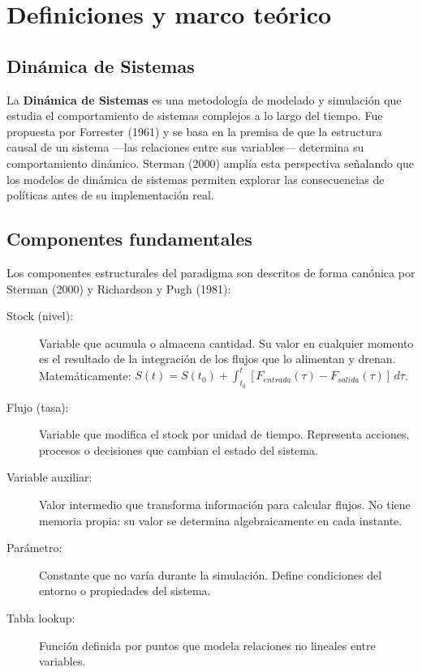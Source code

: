 \documentclass[10pt,a4paper]{article}
\begin{document}
\newpage

\section{Definiciones y marco teórico}

\subsection{Dinámica de Sistemas}

La \textbf{Dinámica de Sistemas} es una metodología de modelado y simulación que estudia el comportamiento de sistemas complejos a lo largo del tiempo. Fue propuesta por Forrester (1961) y se basa en la premisa de que la estructura causal de un sistema ---las relaciones entre sus variables--- determina su comportamiento dinámico. Sterman (2000) amplía esta perspectiva señalando que los modelos de dinámica de sistemas permiten explorar las consecuencias de políticas antes de su implementación real.

\subsection{Componentes fundamentales}

Los componentes estructurales del paradigma son descritos de forma canónica por Sterman (2000) y Richardson y Pugh (1981):

\begin{description}
  \item[Stock (nivel):] Variable que acumula o almacena cantidad. Su valor en cualquier momento es el resultado de la integración de los flujos que lo alimentan y drenan. Matemáticamente: $S(t) = S(t_0) + \int_{t_0}^{t} [F_{entrada}(\tau) - F_{salida}(\tau)]\, d\tau$.

  \item[Flujo (tasa):] Variable que modifica el stock por unidad de tiempo. Representa acciones, procesos o decisiones que cambian el estado del sistema.

  \item[Variable auxiliar:] Valor intermedio que transforma información para calcular flujos. No tiene memoria propia: su valor se determina algebraicamente en cada instante.

  \item[Parámetro:] Constante que no varía durante la simulación. Define condiciones del entorno o propiedades del sistema.

  \item[Tabla lookup:] Función definida por puntos que modela relaciones no lineales entre variables.
\end{description}
\end{document}
